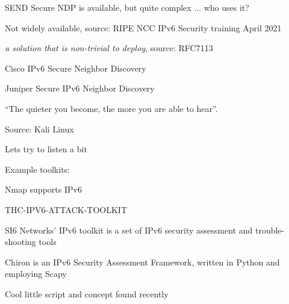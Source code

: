 \documentclass[Screen16to9,17pt]{foils}
\begin{document}
\begin{list2}
\item SEND Secure NDP is available, but quite complex ... who uses it?
\item Not widely available, source: RIPE NCC IPv6 Security training April 2021
\item \emph{a solution that is non-trivial to deploy}, source: RFC7113
\item Cisco IPv6 Secure Neighbor Discovery\\{\footnotesize
{}}
\item Juniper Secure IPv6 Neighbor Discovery\\{\footnotesize
{}}
\end{list2}





\centerline{“The quieter you become, the more you are able to hear”.}
Source: Kali Linux

\begin{list2}
\item Lets try to listen a bit
\end{list2}




\begin{quote}

\end{quote}

Example toolkits:
\begin{list2}
\item Nmap supports IPv6 
\item THC-IPV6-ATTACK-TOOLKIT 
\item SI6 Networks’ IPv6 toolkit is a set of IPv6 security assessment and trouble-shooting tools\\

\item Chiron is an IPv6 Security Assessment Framework, written in Python and employing Scapy\\

\item Cool little script and concept found recently 
\end{list2}
\end{document}
